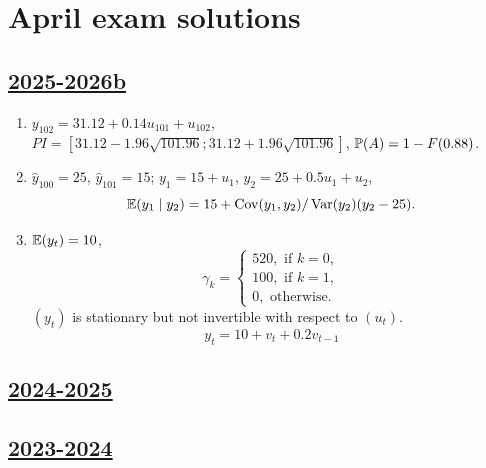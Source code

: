 
\newpage
\thispagestyle{empty}
\section{April exam solutions}


\subsection[2025-2026b]{\hyperref[sec:kr_03_2025_2026b]{2025-2026b}}
\label{sec:sol_kr_03_2025_2026b} %

\begin{enumerate}
    \item $y_{102} = 31.12 + 0.14 u_{101} + u_{102}$, $PI = [31.12 - 1.96 \sqrt{101.96}; 31.12 + 1.96 \sqrt{101.96}]$, $\P(A) = 1- F(0.88)$.
    \item $\hat y_{100} = 25$, $\hat y_{101} = 15$;
    $y_1 = 15 + u_1$, $y_2 = 25 + 0.5u_1 + u_2$, 
    \[
    \E(y_1 \mid y_2) = 15 + \Cov(y_1, y_2)/\Var(y_2)(y_2 - 25).
    \]
    \item $\E(y_t) = 10$, 
    \[
    \gamma_k = \begin{cases}
        520, \text{ if } k = 0, \\
        100, \text{ if } k = 1, \\
        0, \text{ otherwise}.
    \end{cases}
    \]
    $(y_t)$ is stationary but not invertible with respect to $(u_t)$.
    \[
    y_t = 10 + v_t + 0.2 v_{t-1}
    \]
\end{enumerate}


\subsection[2024-2025]{\hyperref[sec:kr_03_2024_2025]{2024-2025}}
\label{sec:sol_kr_03_2024_2025} %


\subsection[2023-2024]{\hyperref[sec:kr_03_2023_2024]{2023-2024}}
\label{sec:sol_kr_03_2023_2024} %

